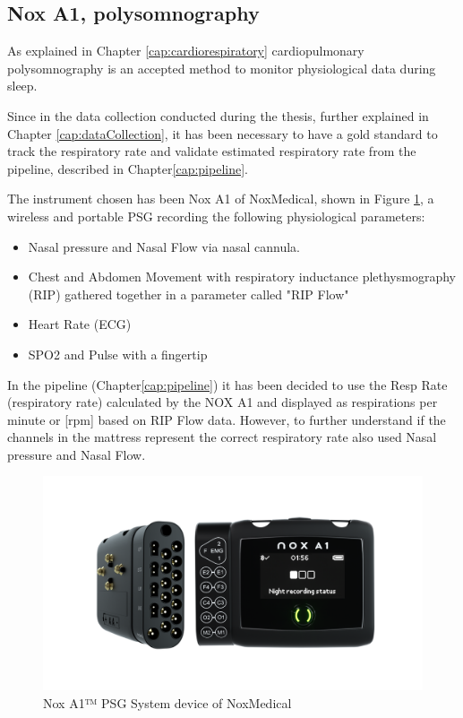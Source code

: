 \subsection{Nox A1, polysomnography} \label{cap:NOXA1}
As explained in Chapter \ref{cap:cardiorespiratory} cardiopulmonary polysomnography is an accepted method to monitor physiological data during sleep.

Since in the data collection conducted during the thesis, further explained in Chapter \ref{cap:dataCollection}, it has been necessary to have a gold standard to track the respiratory rate and validate estimated respiratory rate from the pipeline, described in Chapter\ref*{cap:pipeline}.

The instrument chosen has been Nox A1 of NoxMedical, shown in Figure \ref{fig:NOXA1}, a wireless and portable PSG recording the following physiological parameters: 

\begin{itemize}
    \item Nasal pressure and Nasal Flow via nasal cannula.
    \item Chest and Abdomen Movement with respiratory inductance plethysmography (RIP) gathered together in a parameter called "RIP Flow"
    \item Heart Rate (ECG)
    \item SPO2 and Pulse with a fingertip
\end{itemize}

In the pipeline (Chapter\ref*{cap:pipeline}) it has been decided to use the Resp Rate (respiratory rate) calculated by the NOX A1 and displayed as respirations per minute or [rpm] based on RIP Flow data.
However, to further understand if the channels in the mattress represent the correct respiratory rate also used Nasal pressure and Nasal Flow.

\begin{figure}[H]
    \centering
    \includegraphics[width=\textwidth]{img/1.png}
    \caption{Nox A1™ PSG System device of NoxMedical}
    \label{fig:NOXA1}
\end{figure}

